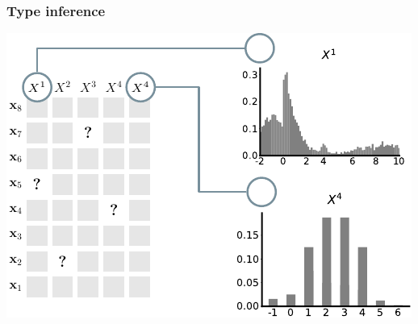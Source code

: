 \documentclass[xcolor={usenames,dvipsnames,svgnames}, compress, aspectratio=169, 11pt]{beamer}
\begin{document}
\begin{frame}[t, htt=bgrey2]
  \frametitle{Type inference}

  \large
  \begin{minipage}[t]{0.5\linewidth}
    \vspace{5pt}
    \includegraphics[width=1.1\linewidth]{figures/abda-miss-hist-type}
  \end{minipage}\hfill\begin{minipage}[t]{0.3\linewidth}
    \vspace{-150pt}
    
    
  \end{minipage}  
\end{frame}
\end{document}
